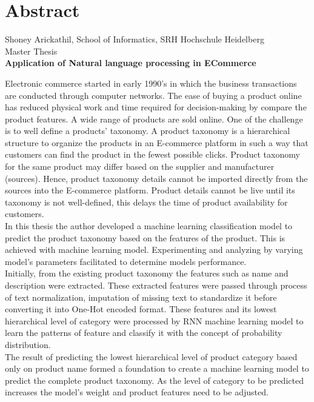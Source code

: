 \chapter*{Abstract}

\begin{center}
    Shoney Arickathil, School of Informatics, SRH Hochschule Heidelberg \\

Master Thesis \\
\textbf{Application of Natural language processing in ECommerce} 

\end{center}


Electronic commerce started in early 1990's in which the business transactions are conducted through computer networks. The ease of buying a product online has reduced physical work and time required for decision-making by compare the product features. A wide range of products are sold online. One of the challenge is to well define a products' taxonomy. A product taxonomy is a hierarchical structure to organize the products in an E-commerce platform in such a way that customers can find the product in the fewest possible clicks.
Product taxonomy for the same product may differ based on the supplier and manufacturer (sources). Hence, product taxonomy details cannot be imported directly from the sources into the E-commerce platform. Product details cannot be live until its taxonomy is not well-defined, this delays the time of product availability for customers. \\

In this thesis the author developed a machine learning classification model to predict the product taxonomy based on the features of the product. This is achieved with machine learning model. Experimenting and analyzing by varying  model's parameters facilitated to determine models performance. \\ 

Initially, from the existing product taxonomy the features such as name and description were extracted. These extracted features were passed through process of text normalization, imputation of missing text to standardize it before converting it into One-Hot encoded format. These features and its lowest hierarchical level of category were processed by \acf*{RNN} machine learning model to learn the patterns of feature and classify it with the concept of probability distribution.\\

The result of predicting the lowest hierarchical level of product category based only on product name formed a foundation to create a machine learning model to predict the complete product taxonomy. As the level of category to be predicted increases the model's weight and product features need to be adjusted. 


